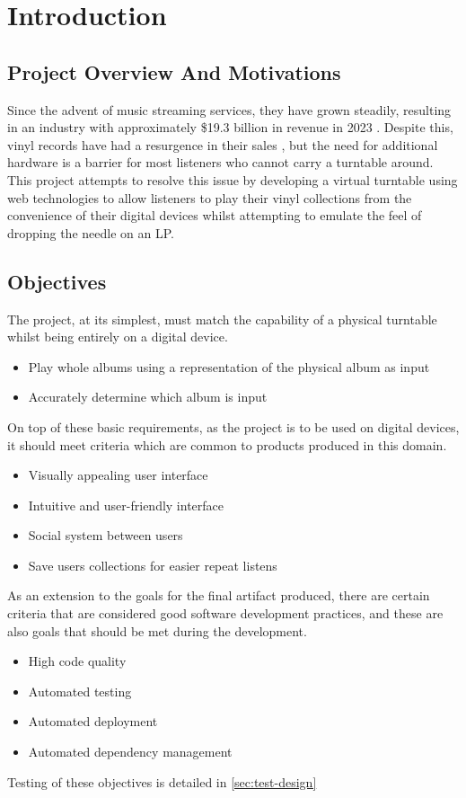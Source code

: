 \chapter{Introduction}
\label{cha:intro}

\section{Project Overview And Motivations}
Since the advent of music streaming services, they have grown steadily, resulting in an industry with approximately \$19.3 billion in revenue in 2023 \cite{IFPI}. Despite this, vinyl records have had a resurgence in their sales \cite{BPI}, but the need for additional hardware is a barrier for most listeners who cannot carry a turntable around. This project attempts to resolve this issue by developing a virtual turntable using web technologies to allow listeners to play their vinyl collections from the convenience of their digital devices whilst attempting to emulate the feel of dropping the needle on an LP.

\section{Objectives} \label{sec:objectives}
The project, at its simplest, must match the capability of a physical turntable whilst being entirely on a digital device.
\begin{itemize}
    \item Play whole albums using a representation of the physical album as input
    \item Accurately determine which album is input
\end{itemize}
On top of these basic requirements, as the project is to be used on digital devices, it should meet criteria which are common to products produced in this domain.
\begin{itemize}
    \item Visually appealing user interface
    \item Intuitive and user-friendly interface
    \item Social system between users
    \item Save users collections for easier repeat listens
\end{itemize}
As an extension to the goals for the final artifact produced, there are certain criteria that are considered good software development practices, and these are also goals that should be met during the development.
\begin{itemize}
    \item High code quality
    \item Automated testing
    \item Automated deployment
    \item Automated dependency management
\end{itemize}
Testing of these objectives is detailed in \ref{sec:test-design}

